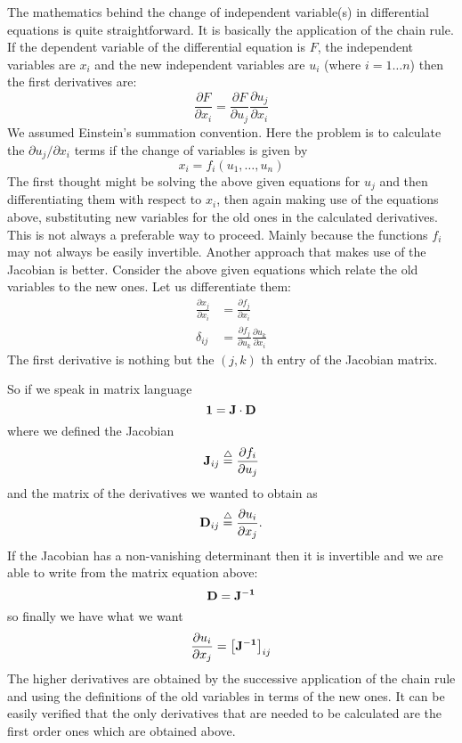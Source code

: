 The mathematics behind the change of independent variable(s) in differential
equations is quite straightforward. It is basically the application of the
chain rule. If the dependent variable of the differential equation is $F$,
the independent variables are $x_{i}$ and the new independent variables are
$u_{i}$ (where ${\scriptstyle i=1\ldots n}$) then the first derivatives are:
\[
    \frac{\partial F}{\partial x_{i}} = \frac{\partial F}{\partial u_{j}}
                                        \frac{\partial u_{j}}{\partial x_{i}}
\]
We assumed Einstein's summation convention. Here the problem is to
calculate the $\partial u_{j}/\partial x_{i}$ terms if the change of variables
is given by
\[
    x_{i} = f_{i}(u_{1},\ldots,u_{n})
\]
The first thought might be solving the above given equations for $u_{j}$ and
then differentiating them with respect to $x_{i}$, then again making use of the
equations above, substituting new variables for the old ones in the calculated
derivatives. This is not always a  preferable way to proceed. Mainly because
the functions $f_{i}$ may not always be easily invertible. Another approach
that makes use of the Jacobian is better. Consider the above given equations
which relate the old variables to the new ones. Let us differentiate them:
\begin{align*}
  \frac{\partial x_{j}}{\partial x_{i}} & = 
        \frac{\partial f_{j}}{\partial x_{i}}   \\
  \delta_{ij} & = 
        \frac{\partial f_{j}}{\partial u_{k}}
        \frac{\partial u_{k}}{\partial x_{i}}
\end{align*}
The first derivative is nothing but the $(j,k)$ th entry of the Jacobian matrix.

So if we speak in matrix language
\[ {\bf 1 = J \cdot D} \]
where we defined the Jacobian
\[ {\bf J}_{ij} \stackrel{\triangle}{=}  \frac{\partial f_{i}}{\partial u_{j}} \]
and the matrix of the derivatives we wanted to obtain as
\[ {\bf D}_{ij} \stackrel{\triangle}{=}  \frac{\partial u_{i}}{\partial x_{j}}. \]
If the Jacobian has a non-vanishing determinant then it is invertible and
we are able to write from the matrix equation above:
\[ {\bf  D = J^{-1}} \]
so finally we have what we want
\[
   \frac{\partial u_{i}}{\partial x_{j}} = \left[{\bf J^{-1}}\right]_{ij}
\]
The higher derivatives are obtained by the successive application of the chain
rule and using the definitions of the old variables in terms of the new ones. It
can be easily verified that the only derivatives that are needed to be
calculated are the first order ones which are obtained above.

